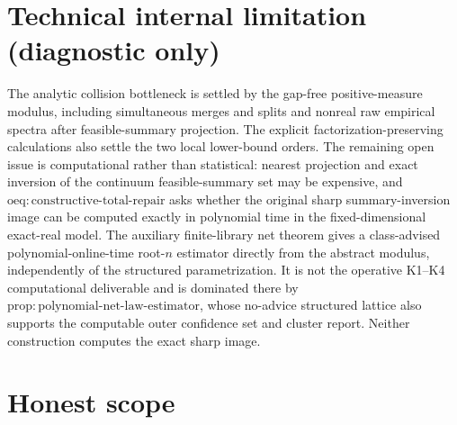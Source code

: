 \documentclass{article}
\begin{document}
\section*{Technical internal limitation (diagnostic only)}

The analytic collision bottleneck is settled by the gap-free positive-measure modulus, including simultaneous merges and splits and nonreal raw empirical spectra after feasible-summary projection. The explicit factorization-preserving calculations also settle the two local lower-bound orders. The remaining open issue is computational rather than statistical: nearest projection and exact inversion of the continuum feasible-summary set may be expensive, and \(\mathrm{oeq:constructive\text{-}total\text{-}repair}\) asks whether the original sharp summary-inversion image can be computed exactly in polynomial time in the fixed-dimensional exact-real model. The auxiliary finite-library net theorem gives a class-advised polynomial-online-time root-\(n\) estimator directly from the abstract modulus, independently of the structured parametrization. It is not the operative K1--K4 computational deliverable and is dominated there by \(\mathrm{prop:polynomial\text{-}net\text{-}law\text{-}estimator}\), whose no-advice structured lattice also supports the computable outer confidence set and cluster report. Neither construction computes the exact sharp image.

\section{Honest scope}
\end{document}
